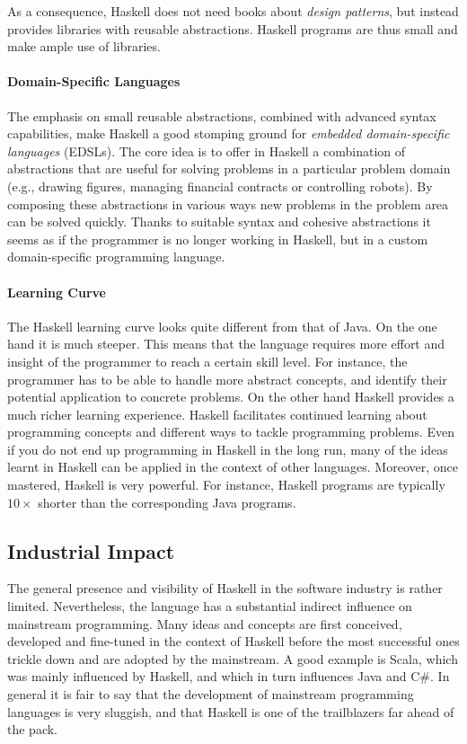 As a consequence, Haskell does not need books about \emph{design patterns}, 
but instead provides libraries with reusable abstractions. Haskell programs
are thus small and make ample use of libraries.

\paragraph{Domain-Specific Languages}
The emphasis on small reusable abstractions, combined with advanced syntax capabilities,
make Haskell a good stomping ground for \emph{embedded domain-specific languages} (EDSLs).
The core idea is to offer in Haskell a combination of abstractions that are useful
for solving problems in a particular problem domain (e.g., drawing figures,
managing financial contracts or controlling robots). By composing these abstractions
in various ways new problems in the problem area can be solved quickly. Thanks to 
suitable syntax and cohesive abstractions it seems as if the programmer is no longer
working in Haskell, but in a custom domain-specific programming language.


\paragraph{Learning Curve}
The Haskell learning curve looks quite different from that of Java.
On the one hand it is much steeper. This means that the language requires 
more effort and insight of the programmer to reach a certain skill level. For instance,
the programmer has to be able to handle more abstract concepts, and identify their potential
application to concrete problems.
On the other hand Haskell provides a much richer learning experience. Haskell facilitates
continued learning about programming concepts and different ways to tackle
programming problems. Even if you do not end up programming in Haskell in the long run, many
of the ideas learnt in Haskell can be applied in the context of other languages.
Moreover, once mastered, Haskell is very powerful. For instance, Haskell programs are
typically $10\times$ shorter than the corresponding Java programs.

\subsection{Industrial Impact}

The general presence and visibility of Haskell in the software industry is
rather limited. Nevertheless, the language has a substantial indirect influence
on mainstream programming. Many ideas and concepts are first conceived, developed 
and fine-tuned in the context of Haskell before the most successful ones trickle
down and are adopted by the mainstream. A good example is Scala, which was
mainly influenced by Haskell, and which in turn influences Java and C\#.
In general it is fair to say that the development of mainstream programming
languages is very sluggish, and that Haskell is one of the trailblazers
far ahead of the pack.

